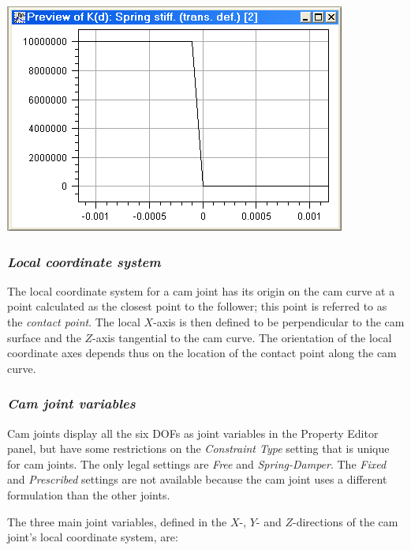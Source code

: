 \hfill\begin{minipage}{0.37\textwidth}
  \includegraphics[width=\textwidth]{Figures/4-3-4-CamJointStiffness}
\end{minipage}

\subsubsection{\sl\textbf{Local coordinate system}}

The local coordinate system for a cam joint has its origin on the cam
curve at a point calculated as the closest point to the follower; this
point is referred to as the {\sl contact point}. The local $X$-axis is
then defined to be perpendicular to the cam surface and the $Z$-axis
tangential to the cam curve. The orientation of the local coordinate
axes depends thus on the location of the contact point along the cam curve.

\subsubsection{\sl\textbf{Cam joint variables}}

Cam joints display all the six DOFs as joint variables in the Property
Editor panel, but have some restrictions on the {\sl Constraint Type}
setting that is unique for cam joints. The only legal settings are
{\sl Free} and {\sl Spring-Damper}. The {\sl Fixed} and
{\sl Prescribed} settings are not available because the cam joint uses
a different formulation than the other joints.

\clearpage
The three main joint variables, defined in the $X$-, $Y$- and $Z$-directions
of the cam joint's local coordinate system, are:

